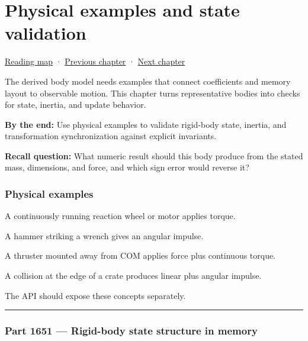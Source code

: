 \chapter{Physical examples and state validation}\label{06-engine-ii-ch037-physical-examples-and-state-validation}\hypertarget{06-engine-ii-ch037}{}\label{stagechapter:06-engine-ii-ch037}

\hypertarget{06-engine-ii-ch037-physical-examples-and-state-validation}{}

\hyperref[volume-reading-map]{Reading map} · \hyperref[06-engine-ii-ch036-auditing-capsule-mass-properties-and-collision-formulas]{Previous chapter} · \hyperref[06-engine-ii-ch038-integrator-choices-and-energy-drift]{Next chapter}

The derived body model needs examples that connect coefficients and memory layout to observable motion. This chapter turns representative bodies into checks for state, inertia, and update behavior.

\textbf{By the end:} Use physical examples to validate rigid-body state, inertia, and transformation synchronization against explicit invariants.

\textbf{Recall question:} What numeric result should this body produce from the stated mass, dimensions, and force, and which sign error would reverse it?

\subsection{Physical examples}\label{06-engine-ii-ch037-physical-examples}

\hypertarget{06-engine-ii-ch037-physical-examples}{}

A continuously running reaction wheel or motor applies torque.

A hammer striking a wrench gives an angular impulse.

A thruster mounted away from COM applies force plus continuous torque.

A collision at the edge of a crate produces linear plus angular impulse.

The API should expose these concepts separately.

\begin{center}\rule{0.5\linewidth}{0.5pt}\end{center}

\subsection{Part 1651 --- Rigid-body state structure in memory}\label{06-engine-ii-ch037-part-1651-rigid-body-state-structure-in-memory}


